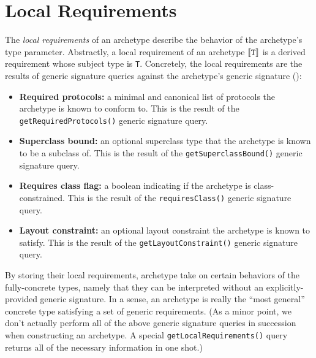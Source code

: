 \documentclass[../generics]{subfiles}
\begin{document}
\section{Local Requirements}\label{local requirements}

The \emph{local requirements} of an archetype describe the behavior of the archetype's type parameter. Abstractly, a local requirement of an archetype $[\![\texttt{T}]\!]$ is a derived requirement whose subject type is \texttt{T}. Concretely, the local requirements are the results of generic signature queries against the archetype's generic signature ():
\begin{itemize}
\item \textbf{Required protocols:} a minimal and canonical list of protocols the archetype is known to conform to. This is the result of the \texttt{getRequiredProtocols()} generic signature query.
\item \textbf{Superclass bound:} an optional superclass type that the archetype is known to be a subclass of. This is the result of the \texttt{getSuperclassBound()} generic signature query.
\item \textbf{Requires class flag:} a boolean indicating if the archetype is class-constrained. This is the result of the \texttt{requiresClass()} generic signature query.
\item \textbf{Layout constraint:} an optional layout constraint the archetype is known to satisfy. This is the result of the \texttt{getLayoutConstraint()} generic signature query.
\end{itemize}
By storing their local requirements, archetype take on certain behaviors of the fully-concrete types, namely that they can be interpreted without an explicitly-provided generic signature. In a sense, an archetype is really the ``most general'' concrete type satisfying a set of generic requirements. (As a minor point, we don't actually perform all of the above generic signature queries in succession when constructing an archetype. A special \texttt{getLocalRequirements()} query returns all of the necessary information in one shot.)
\end{document}
